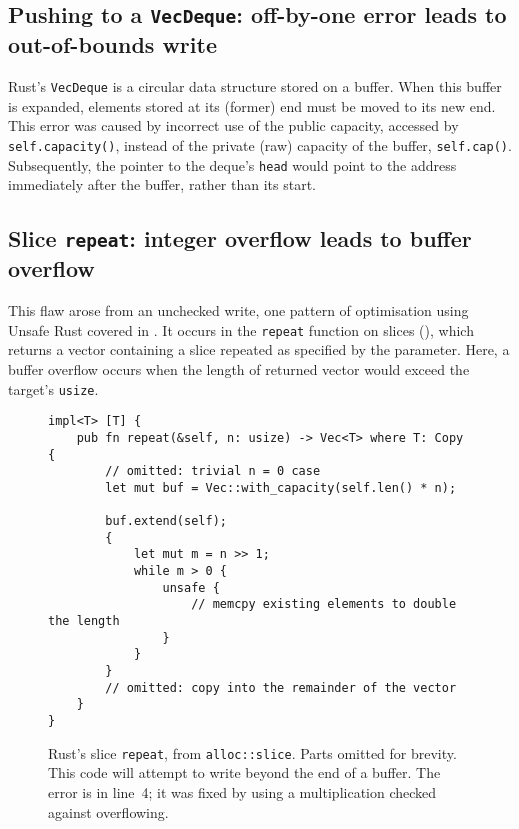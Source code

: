 \documentclass[dissertation.tex]{subfiles}
\begin{document}


\subsection{Pushing to a \texttt{VecDeque}: off-by-one error leads to out-of-bounds write}
\label{sec:eval-micro-push}

Rust's \texttt{VecDeque} is a circular data structure stored on a
buffer.
When this buffer is expanded, elements stored at its (former) end must
be moved to its new end.
This error was caused by incorrect use of the public capacity, accessed
by \texttt{self.capacity()}, instead of the private (raw) capacity of
the buffer, \texttt{self.cap()}.
Subsequently, the pointer to the deque's \texttt{head} would point to
the address immediately after the buffer, rather than its start.



\subsection{Slice \texttt{repeat}: integer overflow leads to buffer overflow}
\label{sec:eval-micro-repeat}

This flaw arose from an unchecked write, one pattern of optimisation
using Unsafe Rust covered in .
It occurs in the \texttt{repeat} function on slices
(), which returns a vector containing a slice
repeated as specified by the parameter.
Here, a buffer overflow occurs when the length of returned vector would
exceed the target's \texttt{usize}.

\begin{figure}[ht]
\begin{lstlisting}
impl<T> [T] {
    pub fn repeat(&self, n: usize) -> Vec<T> where T: Copy {
        // omitted: trivial n = 0 case
        let mut buf = Vec::with_capacity(self.len() * n);

        buf.extend(self);
        {
            let mut m = n >> 1;
            while m > 0 {
                unsafe {
                    // memcpy existing elements to double the length
                }
            }
        }
        // omitted: copy into the remainder of the vector
    }
}
\end{lstlisting}
\caption{ Rust's slice \texttt{repeat}, from
\texttt{alloc::slice}. Parts omitted for brevity. This code will attempt
to write beyond the end of a buffer.
The error is in line~4; it was fixed by using a multiplication checked
against overflowing.}
\label{lst:slice-repeat}
\end{figure}
\end{document}

